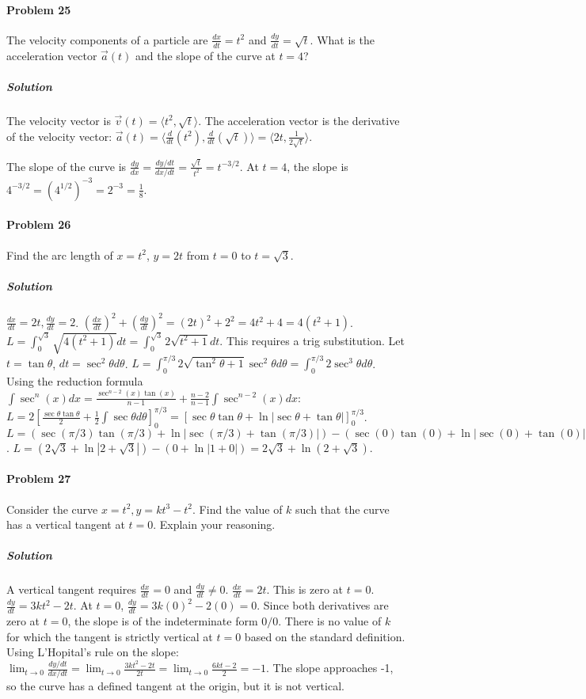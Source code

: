 \documentclass{article}
\begin{document}
\paragraph{Problem 25}
The velocity components of a particle are $\frac{dx}{dt} = t^2$ and $\frac{dy}{dt} = \sqrt{t}$. What is the acceleration vector $\vec{a}(t)$ and the slope of the curve at $t=4$?

\subparagraph{Solution}
The velocity vector is $\vec{v}(t) = \langle t^2, \sqrt{t} \rangle$.
The acceleration vector is the derivative of the velocity vector:
$\vec{a}(t) = \langle \frac{d}{dt}(t^2), \frac{d}{dt}(\sqrt{t}) \rangle = \langle 2t, \frac{1}{2\sqrt{t}} \rangle$.

The slope of the curve is $\frac{dy}{dx} = \frac{dy/dt}{dx/dt} = \frac{\sqrt{t}}{t^2} = t^{-3/2}$.
At $t=4$, the slope is $4^{-3/2} = (4^{1/2})^{-3} = 2^{-3} = \frac{1}{8}$.

\paragraph{Problem 26}
Find the arc length of $x=t^2$, $y=2t$ from $t=0$ to $t=\sqrt{3}$.

\subparagraph{Solution}
$\frac{dx}{dt}=2t, \frac{dy}{dt}=2$.
$(\frac{dx}{dt})^2+(\frac{dy}{dt})^2 = (2t)^2 + 2^2 = 4t^2+4 = 4(t^2+1)$.
$L = \int_0^{\sqrt{3}} \sqrt{4(t^2+1)} dt = \int_0^{\sqrt{3}} 2\sqrt{t^2+1} dt$.
This requires a trig substitution. Let $t=\tan\theta$, $dt=\sec^2\theta d\theta$.
$L = \int_0^{\pi/3} 2\sqrt{\tan^2\theta+1}\sec^2\theta d\theta = \int_0^{\pi/3} 2\sec^3\theta d\theta$.
Using the reduction formula $\int \sec^n(x)dx = \frac{\sec^{n-2}(x)\tan(x)}{n-1} + \frac{n-2}{n-1}\int \sec^{n-2}(x)dx$:
$L = 2 \left[ \frac{\sec\theta\tan\theta}{2} + \frac{1}{2}\int \sec\theta d\theta \right]_0^{\pi/3} = [\sec\theta\tan\theta + \ln|\sec\theta+\tan\theta|]_0^{\pi/3}$.
$L = (\sec(\pi/3)\tan(\pi/3) + \ln|\sec(\pi/3)+\tan(\pi/3)|) - (\sec(0)\tan(0) + \ln|\sec(0)+\tan(0)|)$.
$L = (2\sqrt{3} + \ln|2+\sqrt{3}|) - (0 + \ln|1+0|) = 2\sqrt{3} + \ln(2+\sqrt{3})$.

\paragraph{Problem 27}
Consider the curve $x=t^2, y=k t^3 - t^2$. Find the value of $k$ such that the curve has a vertical tangent at $t=0$. Explain your reasoning.

\subparagraph{Solution}
A vertical tangent requires $\frac{dx}{dt}=0$ and $\frac{dy}{dt} \neq 0$.
$\frac{dx}{dt} = 2t$. This is zero at $t=0$.
$\frac{dy}{dt} = 3kt^2 - 2t$.
At $t=0$, $\frac{dy}{dt} = 3k(0)^2 - 2(0) = 0$.
Since both derivatives are zero at $t=0$, the slope is of the indeterminate form $0/0$. There is no value of $k$ for which the tangent is strictly vertical at $t=0$ based on the standard definition. Using L'Hopital's rule on the slope:
$\lim_{t\to 0} \frac{dy/dt}{dx/dt} = \lim_{t\to 0} \frac{3kt^2-2t}{2t} = \lim_{t\to 0} \frac{6kt-2}{2} = -1$.
The slope approaches -1, so the curve has a defined tangent at the origin, but it is not vertical.
\end{document}

